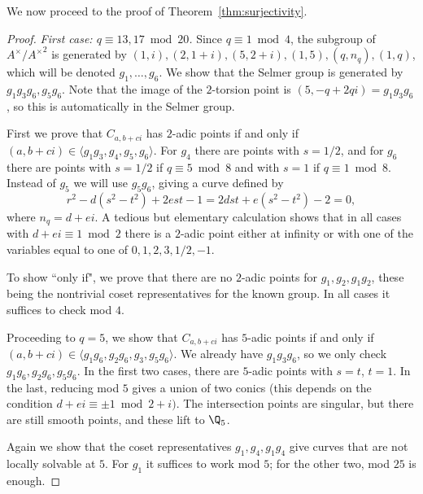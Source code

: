 \documentclass[12pt]{amsart}
\begin{document}
We now proceed to the proof of Theorem~\ref{thm:surjectivity}.
\begin{proof}
{\em First case: $q \equiv 13, 17 \bmod 20$.}  Since $q \equiv 1 \bmod 4$, the subgroup
of $A^\times/{A^\times}^2$ is generated by $(1,i),(2,1+i),(5,2+i),(1,5),(q,n_q),(1,q)$,
which will be denoted $g_1, \dots, g_6$.  We show that the Selmer group is generated by
$g_1g_3g_6, g_5g_6$.  Note that the image of the $2$-torsion point is $(5,-q+2qi) = g_1g_3g_6$,
so this is automatically in the Selmer group.

First we prove that $C_{a,b+ci}$ has $2$-adic points if and only if 
$(a,b+ci) \in \langle g_1g_3,g_4,g_5,g_6 \rangle$.  For $g_4$ there are points with $s = 1/2$,
and for $g_6$ there are points with $s = 1/2$ if $q \equiv 5 \bmod 8$ and with $s = 1$ if
$q \equiv 1 \bmod 8$.  Instead of $g_5$ we will use $g_5g_6$, giving a curve defined by
$$r^2-d(s^2-t^2)+2est-1 = 2dst+e(s^2-t^2)-2 = 0,$$ where $n_q = d+ei$.  A tedious but elementary
calculation shows that in all cases with $d+ei \equiv 1 \bmod 2$
there is a $2$-adic point either at infinity or with one
of the variables equal to one of $0, 1, 2, 3, 1/2, -1$.

To show ``only if", we prove that there are no $2$-adic points for $g_1,g_2,g_1g_2$, these
being the nontrivial coset representatives for the known group.
In all cases it suffices to check mod $4$.

Proceeding to $q=5$, we show that $C_{a,b+ci}$ has $5$-adic points if and only if
$(a,b+ci) \in \langle g_1g_6,g_2g_6,g_3,g_5g_6 \rangle$.
We already have $g_1g_3g_6$, so we only check $g_1g_6,g_2g_6, g_5g_6$.
In the first two cases, there are $5$-adic points with $s=t$, $t=1$.  In the last, reducing mod
$5$ gives a union of two conics (this depends on the condition $d+ei \equiv \pm1 \bmod 2+i)$.
The intersection points are singular, but there are still smooth points, and these lift to
$\Q_5$.

Again we show that the coset representatives $g_1,g_4,g_1g_4$ give curves that are not
locally solvable at $5$.  For $g_1$ it suffices to work mod $5$; for the other two, 
mod $25$ is enough.


\end{proof}
\end{document}
